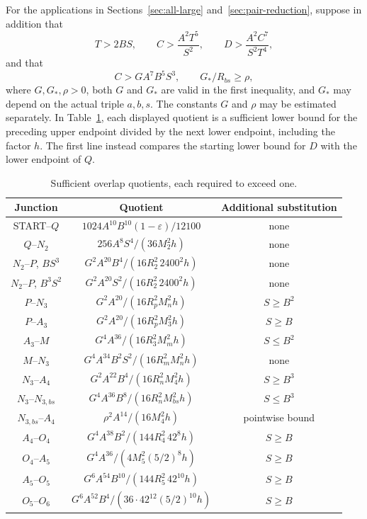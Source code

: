 \documentclass[12pt]{article}
\numberwithin{equation}{section}
\begin{document}
For the applications in Sections~\ref{sec:all-large} and~\ref{sec:pair-reduction}, suppose in addition that
\[
 T>2BS,\qquad C>\frac{A^2T^5}{S^2},\qquad
 D>\frac{A^2C^7}{S^2T^4},
\]
and that
\begin{equation}\label{eq:pr-coarse-gap}
 C>GA^7B^5S^3,
 \qquad G_* /R_{bs}\ge\rho,
\end{equation}
where $G,G_*,\rho>0$, both $G$ and $G_*$ are valid in the first inequality,
and $G_*$ may depend on the actual triple $a,b,s$.
The constants $G$ and $\rho$ may be estimated separately.
In Table~\ref{tab:pr-overlaps}, each displayed quotient is a sufficient
lower bound for the preceding upper endpoint divided by the next
lower endpoint, including the factor $h$. The first line instead
compares the starting lower bound for $D$ with the lower endpoint of $Q$.
\begin{table}[htbp]
\centering\small
\caption{Sufficient overlap quotients, each required to exceed one.}
\label{tab:pr-overlaps}
\begin{tabular}{c|c|c}
Junction&Quotient&Additional substitution\\\hline
START--\(Q\)&\(1024A^{10}B^{10}(1-\varepsilon)/12100\)&none\\
\(Q\)--\(N_2\)&\(256A^8S^4/(36M_2^2h)\)&none\\
\(N_2\)--\(P\), \(BS^3\)&\(G^2A^{20}B^4/(16R_2^2\,2400^2h)\)&none\\
\(N_2\)--\(P\), \(B^3S^2\)&\(G^2A^{20}S^2/(16R_2^2\,2400^2h)\)&none\\
\(P\)--\(N_3\)&\(G^2A^{20}/(16R_p^2M_n^2h)\)&\(S\ge B^2\)\\
\(P\)--\(A_3\)&\(G^2A^{20}/(16R_p^2M_3^2h)\)&\(S\ge B\)\\
\(A_3\)--\(M\)&\(G^4A^{36}/(16R_3^2M_m^2h)\)&\(S\le B^2\)\\
\(M\)--\(N_3\)&\(G^4A^{34}B^2S^2/(16R_m^2M_n^2h)\)&none\\
\(N_3\)--\(A_4\)&\(G^2A^{22}B^4/(16R_n^2M_4^2h)\)&\(S\ge B^3\)\\
\(N_3\)--\(N_{3,bs}\)&\(G^4A^{36}B^8/(16R_n^2M_{bs}^2h)\)&\(S\le B^3\)\\
\(N_{3,bs}\)--\(A_4\)&\(\rho^2A^{14}/(16M_4^2h)\)&pointwise bound\\
\(A_4\)--\(O_4\)&\(G^4A^{38}B^2/(144R_4^2\,42^8h)\)&\(S\ge B\)\\
\(O_4\)--\(A_5\)&\(G^4A^{36}/(4M_5^2(5/2)^8h)\)&\(S\ge B\)\\
\(A_5\)--\(O_5\)&\(G^6A^{54}B^{10}/(144R_5^2\,42^{10}h)\)&\(S\ge B\)\\
\(O_5\)--\(O_6\)&\(G^6A^{52}B^4/(36\cdot42^{12}(5/2)^{10}h)\)&\(S\ge B\)
\end{tabular}
\end{table}
\end{document}
